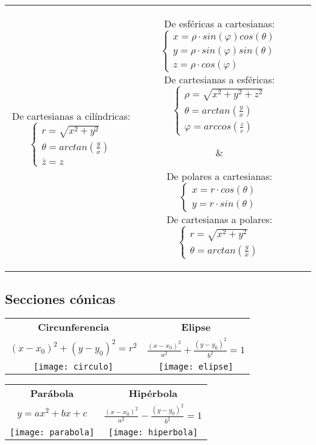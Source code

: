 \documentclass[a4paper, twoside]{article}
\numberwithin{equation}{section}
\numberwithin{figure}{section}
\numberwithin{table}{section}
\begin{document}
\begin{table}[H]
\begin{tabular}{c|c|c}
{\begin{center}
				De cartesianas a cilíndricas:
				$\begin{cases}
				r=\sqrt{x^2+y^2} \\
				\theta=arctan(\frac{y}{x}) \\
				\bar{z}=z
				\end{cases}$
			\end{center}} &
		\parbox{5cm}{
			\begin{center}
				De esféricas a cartesianas:
				$\begin{cases}
				x=\rho\cdot sin(\varphi)cos(\theta) \\
				y=\rho\cdot sin(\varphi)sin(\theta) \\
				z=\rho\cdot cos(\varphi)
				\end{cases}$ \\
				De cartesianas a esféricas:
				$\begin{cases}
				\rho=\sqrt{x^2+y^2+z^2} \\
				\theta=arctan(\frac{y}{x}) \\
				\varphi=arccos(\frac{z}{r})\end{cases}$
			\end{center}} & 
		\parbox{5cm}{
			\begin{center}
				De polares a cartesianas:
				$\begin{cases}
				x=r\cdot cos(\theta) \\
				y=r\cdot sin(\theta)
				\end{cases}$ \\
				De cartesianas a polares:
				$\begin{cases}
				r=\sqrt{x^2+y^2} \\
				\theta=arctan(\frac{y}{x})
				\end{cases}$
			\end{center}} \\
	\end{tabular}
\end{table}

\subsection{Secciones cónicas}
\begin{center}
	\setlength{\tabcolsep}{30pt}
	\begin{tabular}{c c}
		\textbf{Circunferencia} & \textbf{Elipse} \\
		$(x-x_0)^2+(y-y_0)^2=r^2$ & $\frac{(x-x_0)^2}{a^2}+\frac{(y-y_0)^2}{b^2}=1$ \\
		\texttt{[image: circulo]} & \texttt{[image: elipse]}
	\end{tabular}
	\begin{tabular}{c c}
		\textbf{Parábola} & \textbf{Hipérbola} \\
		$y=ax^2+bx+c$ & $\frac{(x-x_0)^2}{a^2}-\frac{(y-y_0)^2}{b^2}=1$ \\
		\texttt{[image: parabola]} & \texttt{[image: hiperbola]}	
	\end{tabular}
	\setlength{\tabcolsep}{6pt}
\end{center}
\end{document}
